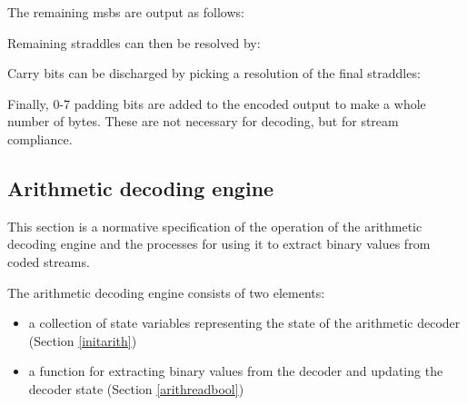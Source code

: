 \begin{informative*}
The remaining msbs are output as follows:

\begin{pseudo*}
    \bsEND
\bsEND
\end{pseudo*}

Remaining straddles can then be resolved by:

\begin{pseudo*}
\bsEND
\end{pseudo*}

Carry bits can be discharged by picking a resolution of
the final straddles:

\begin{pseudo*}
\bsEND
\end{pseudo*}

Finally, 0-7 padding bits are added to the encoded output to make
a whole number of bytes. These are not necessary for decoding, but
for stream compliance.

\end{informative*}
\subsection{Arithmetic decoding engine}
\label{arithengine}

This section is a normative specification of the operation of the arithmetic
decoding engine and the processes for using it to extract binary values from coded streams.

The arithmetic decoding engine consists of two elements: 
\begin{itemize}
\item a collection of state variables representing the state of the arithmetic 
decoder (Section \ref{initarith})
\item a function for extracting binary values from the decoder 
and updating the decoder state (Section \ref{arithreadbool})
\end{itemize}

